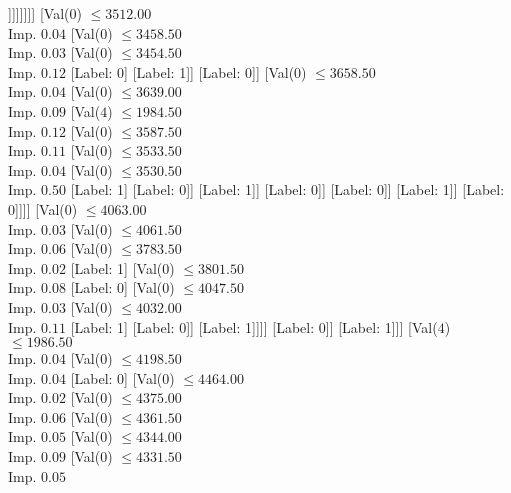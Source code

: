 \documentclass[margin=10pt]{standalone}
\begin{document}
\begin{forest}
																				[Label: 0]
																				[Label: 1]]]]]]]]
													[Val($0$) $ \leq 3512.00$ \\ Imp. $0.04$
														[Val($0$) $ \leq 3458.50$ \\ Imp. $0.03$
															[Val($0$) $ \leq 3454.50$ \\ Imp. $0.12$
																[Label: 0]
																[Label: 1]]
															[Label: 0]]
														[Val($0$) $ \leq 3658.50$ \\ Imp. $0.04$
															[Val($0$) $ \leq 3639.00$ \\ Imp. $0.09$
																[Val($4$) $ \leq 1984.50$ \\ Imp. $0.12$
																	[Val($0$) $ \leq 3587.50$ \\ Imp. $0.11$
																		[Val($0$) $ \leq 3533.50$ \\ Imp. $0.04$
																			[Val($0$) $ \leq 3530.50$ \\ Imp. $0.50$
																				[Label: 1]
																				[Label: 0]]
																			[Label: 1]]
																		[Label: 0]]
																	[Label: 0]]
																[Label: 1]]
															[Label: 0]]]]
												[Val($0$) $ \leq 4063.00$ \\ Imp. $0.03$
													[Val($0$) $ \leq 4061.50$ \\ Imp. $0.06$
														[Val($0$) $ \leq 3783.50$ \\ Imp. $0.02$
															[Label: 1]
															[Val($0$) $ \leq 3801.50$ \\ Imp. $0.08$
																[Label: 0]
																[Val($0$) $ \leq 4047.50$ \\ Imp. $0.03$
																	[Val($0$) $ \leq 4032.00$ \\ Imp. $0.11$
																		[Label: 1]
																		[Label: 0]]
																	[Label: 1]]]]
														[Label: 0]]
													[Label: 1]]]
											[Val($4$) $ \leq 1986.50$ \\ Imp. $0.04$
												[Val($0$) $ \leq 4198.50$ \\ Imp. $0.04$
													[Label: 0]
													[Val($0$) $ \leq 4464.00$ \\ Imp. $0.02$
														[Val($0$) $ \leq 4375.00$ \\ Imp. $0.06$
															[Val($0$) $ \leq 4361.50$ \\ Imp. $0.05$
																[Val($0$) $ \leq 4344.00$ \\ Imp. $0.09$
																	[Val($0$) $ \leq 4331.50$ \\ Imp. $0.05$

\end{forest}
\end{document}
